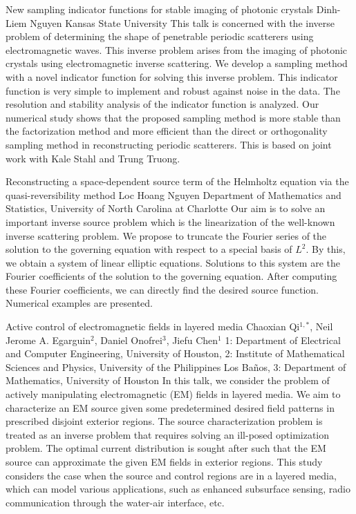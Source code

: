 \begin{addmargin}[2em]{0em}
\vspace{1.5ex}
\abs
{New sampling indicator functions for stable imaging of photonic crystals}
{Dinh-Liem Nguyen}
{Kansas State University}
{This talk is concerned with the inverse problem of determining the shape of penetrable periodic scatterers using electromagnetic waves. This inverse problem arises from the imaging of photonic crystals using electromagnetic inverse scattering. We develop a sampling method with a novel indicator function for solving this inverse problem. This indicator function is very simple to implement and robust against noise in the data. The resolution and stability analysis of the indicator function is analyzed. Our numerical study shows that the proposed sampling method is more stable than the factorization method and more efficient than the direct or orthogonality sampling method in reconstructing periodic scatterers. This is based on joint work with Kale Stahl and Trung Truong.}


\vspace{1.5ex}
\abs
{Reconstructing a space-dependent source term of the Helmholtz equation via the quasi-reversibility method}
{Loc Hoang Nguyen}
{Department of Mathematics and Statistics, University of North Carolina at Charlotte}
{Our aim is to solve an important inverse source problem which is the linearization of the well-known inverse scattering problem. We propose to truncate the Fourier series of the solution to the governing equation with respect to a special basis of $L^2$. By this, we obtain a system of linear elliptic equations. Solutions to this system are the Fourier coefficients of the solution to the governing equation. After computing these Fourier coefficients, we can directly find the desired source function. Numerical examples are presented.}


\vspace{1.5ex}
\abs
{Active control of electromagnetic fields in layered media}
{Chaoxian Qi$^{1,*}$, Neil Jerome A. Egarguin$^2$, Daniel Onofrei$^3$, Jiefu Chen$^1$}
{1: Department of Electrical and Computer Engineering, University of Houston, 2: Institute of Mathematical Sciences and Physics, University of the Philippines Los Ba\~nos, 3: Department of Mathematics, University of Houston}
{In this talk, we consider the problem of actively manipulating electromagnetic (EM) fields in layered media. We aim to characterize an EM source given some predetermined desired field patterns in prescribed disjoint exterior regions. The source characterization problem is treated as an inverse problem that requires solving an ill-posed optimization problem. The optimal current distribution is sought after such that the EM source can approximate the given EM fields in exterior regions. This study considers the case when the source and control regions are in a layered media, which can model various applications, such as enhanced subsurface sensing, radio communication through the water-air interface, etc.}

\end{addmargin}
